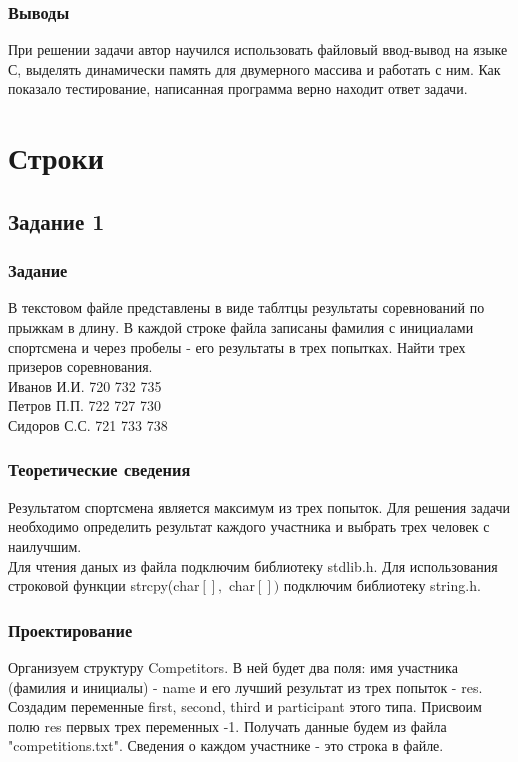 \documentclass[12pt,a4paper]{report}
\begin{document}
\subsection{Выводы}
При решении задачи автор научился использовать файловый ввод-вывод на языке С, выделять динамически память для двумерного массива и работать с ним. Как показало тестирование, написанная программа верно находит ответ задачи. \\
\newpage

\chapter{Строки}
\section{Задание 1}
\subsection{Задание}
В текстовом файле представлены в виде таблтцы результаты соревнований по прыжкам в длину. В каждой строке файла записаны фамилия с инициалами спортсмена и через пробелы - его результаты в трех попытках. Найти трех призеров соревнования. \\
Иванов И.И. 720 732 735 \\
Петров П.П. 722 727 730 \\
Сидоров С.С. 721 733 738 \\
\subsection{Теоретические сведения}
Результатом спортсмена является максимум из трех попыток. Для решения задачи необходимо определить результат каждого участника и выбрать трех человек с наилучшим. \\
Для чтения даных из файла подключим библиотеку stdlib.h. Для использования строковой функции strcpy(char$[],$ char$[])$ подключим библиотеку string.h. 
\subsection{Проектирование}
Организуем структуру Competitors. В ней будет два поля: имя участника (фамилия и инициалы) - name и его лучший результат из трех попыток - res. Создадим переменные first, second, third и participant этого типа. Присвоим полю res первых трех переменных -1. Получать данные будем из файла "competitions.txt". Сведения о каждом участнике - это строка в файле. \\
\end{document}
